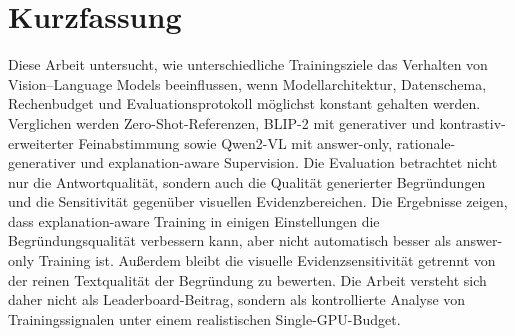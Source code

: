 \chapter*{Kurzfassung}
Diese Arbeit untersucht, wie unterschiedliche Trainingsziele das Verhalten von Vision--Language Models beeinflussen, wenn Modellarchitektur, Datenschema, Rechenbudget und Evaluationsprotokoll möglichst konstant gehalten werden.
Verglichen werden Zero-Shot-Referenzen, BLIP-2 mit generativer und kontrastiv-erweiterter Feinabstimmung sowie Qwen2-VL mit answer-only, rationale-generativer und explanation-aware Supervision.
Die Evaluation betrachtet nicht nur die Antwortqualität, sondern auch die Qualität generierter Begründungen und die Sensitivität gegenüber visuellen Evidenzbereichen.
Die Ergebnisse zeigen, dass explanation-aware Training in einigen Einstellungen die Begründungsqualität verbessern kann, aber nicht automatisch besser als answer-only Training ist.
Außerdem bleibt die visuelle Evidenzsensitivität getrennt von der reinen Textqualität der Begründung zu bewerten.
Die Arbeit versteht sich daher nicht als Leaderboard-Beitrag, sondern als kontrollierte Analyse von Trainingssignalen unter einem realistischen Single-GPU-Budget.
